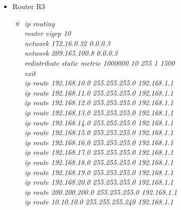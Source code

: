 \documentclass[a4paper, 12pt]{article}
\begin{document}
\begin{itemize}
\begin{itemize}
\begin{itemize}
          \end{itemize}
             \item Router R3
        \begin{itemize}
         \item \textit{ip routing\\
                        router eigrp 10\\
                        network 172.16.0.32 0.0.0.3\\
                        network 209.165.100.8 0.0.0.3\\
                        redistribute static metric 1000000 10 255 1 1500\\
                        exit\\
                        ip route 192.168.10.0 255.255.255.0 192.168.1.1\\
                        ip route 192.168.11.0 255.255.255.0 192.168.1.1\\
                        ip route 192.168.12.0 255.255.255.0 192.168.1.1\\
                        ip route 192.168.13.0 255.255.255.0 192.168.1.1\\
                        ip route 192.168.14.0 255.255.255.0 192.168.1.1\\
                        ip route 192.168.15.0 255.255.255.0 192.168.1.1\\
                        ip route 192.168.16.0 255.255.255.0 192.168.1.1\\
                        ip route 192.168.17.0 255.255.255.0 192.168.1.1\\
                        ip route 192.168.18.0 255.255.255.0 192.168.1.1\\
                        ip route 192.168.19.0 255.255.255.0 192.168.1.1\\
                        ip route 192.168.20.0 255.255.255.0 192.168.1.1\\
                        ip route 200.200.200.0 255.255.255.0 192.168.1.1\\
                        ip route 10.10.10.0 255.255.255.240 192.168.1.1\\}
         

\end{itemize}
\end{itemize}
\end{itemize}
\end{document}
